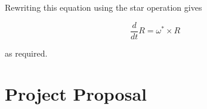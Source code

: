 \documentclass[12pt,a4paper,twoside,openright]{report}
\begin{document}
Rewriting this equation using the star operation gives

\begin{equation}
    \frac{d}{dt}R = \omega^* \times R
\end{equation}

as required.

\chapter{Project Proposal}
\label{proposallbl}

\end{document}
